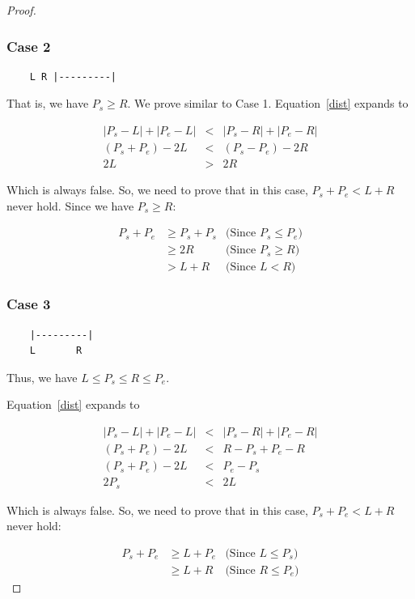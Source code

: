 \documentclass[a4paper]{article}
\begin{document}
\begin{proof}
	\subsubsection*{Case 2}
	
	\begin{verbatim}
	L R |---------|
	\end{verbatim}
	
	That is, we have $P_s \ge R$. We prove similar to Case 1.
	Equation~\ref{dist} expands to
	
	\begin{eqnarray*}
		|P_s - L| + |P_e - L| &<& |P_s - R| + |P_e - R| \\
		(P_s + P_e) - 2L &<& (P_s - P_e) - 2R\\
		2L &>& 2R
	\end{eqnarray*}
	
	Which is always false. So, we need to prove that in this case,
	$P_s + P_e < L+R$ never hold. Since we have $P_s \ge R$:
	
	\begin{eqnarray*}
		P_s + P_e &\ge P_s + P_s & \text{(Since $P_s \le P_e$)} \\
		&\ge 2R & \text{(Since $P_s \ge R$)} \\
		&> L + R & \text{(Since $L < R$)}
	\end{eqnarray*}
	
	\subsubsection*{Case 3}
	
	\begin{verbatim}
	|---------|
	L       R
	\end{verbatim}
	
	Thus, we have $L \le P_s \le R \le P_e$.
	
	Equation~\ref{dist} expands to
	
	\begin{eqnarray*}
		|P_s - L| + |P_e - L| &<& |P_s - R| + |P_e - R| \\
		(P_s + P_e) - 2L &<& R - P_s + P_e - R \\
		(P_s + P_e) - 2L &<& P_e - P_s \\
		2P_s &<& 2L
	\end{eqnarray*}
	
	Which is always false. So, we need to prove that in this case,
	$P_s + P_e < L+R$ never hold:
	
	\begin{eqnarray*}
		P_s + P_e &\ge L + P_e & \text{(Since $L \le P_s$)} \\
		&\ge L + R & \text{(Since $R \le P_e$)}
	\end{eqnarray*}
	

\end{proof}
\end{document}
